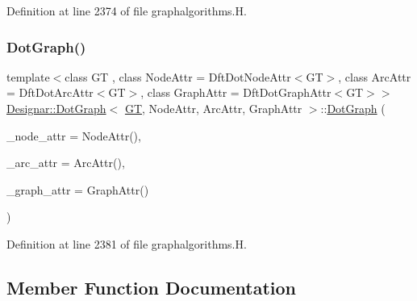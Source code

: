 Definition at line 2374 of file graphalgorithms.\+H.

\mbox{\label{class_designar_1_1_dot_graph_a73a8e33201f40c6a3085eda7a573af6f}} 
\subsubsection{\texorpdfstring{Dot\+Graph()}{DotGraph()}\hspace{0.1cm}{\footnotesize\ttfamily [2/2]}}
{\footnotesize\ttfamily template$<$class GT , class Node\+Attr  = Dft\+Dot\+Node\+Attr$<$\+G\+T$>$, class Arc\+Attr  = Dft\+Dot\+Arc\+Attr$<$\+G\+T$>$, class Graph\+Attr  = Dft\+Dot\+Graph\+Attr$<$\+G\+T$>$$>$ \\
\hyperlink{class_designar_1_1_dot_graph}{Designar\+::\+Dot\+Graph}$<$ \hyperlink{demo-buildgraph_8_c_a3001c40d2c31ca87ed96cd7d1334a55e}{GT}, Node\+Attr, Arc\+Attr, Graph\+Attr $>$\+::\hyperlink{class_designar_1_1_dot_graph}{Dot\+Graph} (\begin{DoxyParamCaption}\item[{Node\+Attr \&\&}]{\+\_\+node\+\_\+attr = {\ttfamily NodeAttr()},  }\item[{Arc\+Attr \&\&}]{\+\_\+arc\+\_\+attr = {\ttfamily ArcAttr()},  }\item[{Graph\+Attr \&\&}]{\+\_\+graph\+\_\+attr = {\ttfamily GraphAttr()} }\end{DoxyParamCaption})\hspace{0.3cm}{\ttfamily [inline]}}



Definition at line 2381 of file graphalgorithms.\+H.



\subsection{Member Function Documentation}
\mbox{\label{class_designar_1_1_dot_graph_afa9f692e6ec45dba1cd8e9ebf830f212}} 
